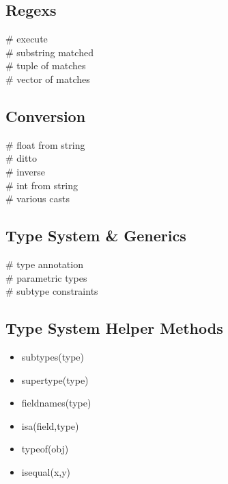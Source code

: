 \subsection*{Regexs}
 \# execute \\
 \# substring matched \\
 \# tuple of matches \\
 \# vector of matches \\




\subsection*{Conversion}
 \# float from string \\
 \# ditto \\
 \# inverse \\
 \# int from string \\
 \# various casts \\


\subsection*{Type System \& Generics}
 \# type annotation \\
 \# parametric types \\
 \# subtype constraints \\




\subsection*{Type System Helper Methods}
\begin{itemize}
    \item subtypes(type)
    \item supertype(type)
    \item fieldnames(type)
    \item isa(field,type)
    \item typeof(obj)
    \item isequal(x,y)
\end{itemize}
